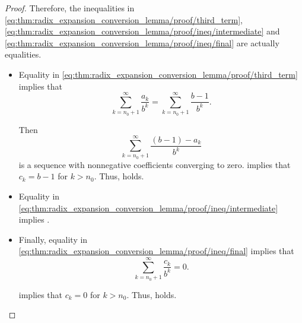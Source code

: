 \begin{proof}
  Therefore, the inequalities in \eqref{eq:thm:radix_expansion_conversion_lemma/proof/third_term}, \eqref{eq:thm:radix_expansion_conversion_lemma/proof/ineq/intermediate} and \eqref{eq:thm:radix_expansion_conversion_lemma/proof/ineq/final} are actually equalities.

  \begin{itemize}
    \item Equality in \eqref{eq:thm:radix_expansion_conversion_lemma/proof/third_term} implies that
    \begin{equation*}
      \sum_{k=n_0+1}^\infty \frac {a_k} {b^k}
      =
      \sum_{k=n_0+1}^\infty \frac {b - 1} {b^k}.
    \end{equation*}

    Then
    \begin{equation*}
      \sum_{k=n_0+1}^\infty \frac {(b - 1) - a_k} {b^k}
    \end{equation*}
    is a sequence with nonnegative coefficients converging to zero.  implies that \( c_k = b - 1 \) for \( k > n_0 \). Thus,  holds.

    \item Equality in \eqref{eq:thm:radix_expansion_conversion_lemma/proof/ineq/intermediate} implies .

    \item Finally, equality in \eqref{eq:thm:radix_expansion_conversion_lemma/proof/ineq/final} implies that
    \begin{equation*}
      \sum_{k=n_0+1}^\infty \frac {c_k} {b^k} = 0.
    \end{equation*}

     implies that \( c_k = 0 \) for \( k > n_0 \). Thus,  holds.
  \end{itemize}
\end{proof}


